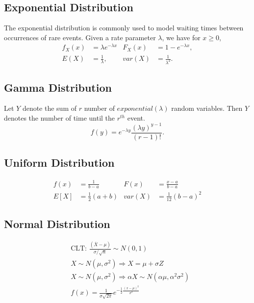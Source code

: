 \documentclass[11pt, twocolumn]{article}
\theoremstyle{definition}
\begin{document}
\subsection*{Exponential Distribution}
The exponential distribution is commonly used to model waiting times between occurrences of rare events. Given a rate parameter $\lambda$, we have for $x \geq 0$,
\begin{align*}
f_X(x)&=\lambda e^{-\lambda x} &F_X(x)&=1-e^{-\lambda x},\\
E(X)&=\frac{1}{\lambda},  &var(X)&=\frac{1}{\lambda ^2}.
\end{align*}




\subsection*{Gamma Distribution}
Let $Y$ denote the sum of $r$ number of $exponential(\lambda)$ random variables. Then $Y$ denotes the number of time until the $r^{th}$ event.
\[f(y)=e^{-\lambda y}\frac{ (\lambda y)^{y-1}}{(r-1)!}.\]




\subsection*{Uniform Distribution} \vspace{-.1cm}
\begin{align*}
f(x)&=\frac{1}{b-a} &F(x)&=\frac{x-a}{b-a}\\
E[X]&=\frac{1}{2}(a+b) &var(X)&=\frac{1}{12}(b-a)^2
\end{align*}




\subsection*{Normal Distribution} \vspace{-.1cm}
\begin{align*}
&\text{CLT: }\frac{(\overline{X}-\mu)}{\sigma/\sqrt{n}}\sim N(0,1)\\
&X \sim N(\mu, \sigma^2) \Longrightarrow X=\mu + \sigma Z\\
&X \sim N(\mu, \sigma^2) \Longrightarrow \alpha X \sim N(\alpha \mu,\alpha^2 \sigma ^2)\\
&f(x)=\frac{1}{\sigma \sqrt{2\pi}}e^{ - \frac{1}{2}\frac{(x-\mu)^2}{\sigma ^2}}
\end{align*}
\end{document}
